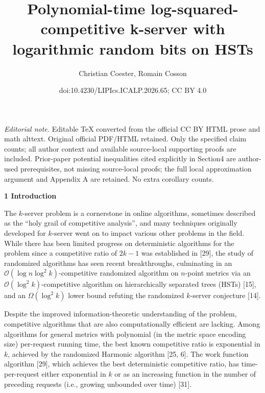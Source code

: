 \documentclass[10pt,a4paper]{article}
\title{Polynomial-time log-squared-competitive k-server with logarithmic random bits on HSTs}
\author{Christian Coester, Romain Cosson}
\date{doi:10.4230/LIPIcs.ICALP.2026.65; CC BY 4.0}
\begin{document}
\maketitle
\noindent\textit{Editorial note.} Editable TeX converted from the official CC BY HTML prose and math alttext. Original official PDF/HTML retained. Only the specified claim counts; all author context and available source-local supporting proofs are included. Prior-paper potential inequalities cited explicitly in Section4 are author-used prerequisites, not missing source-local proofs; the full local approximation argument and Appendix A are retained. No extra corollary counts.\par\medskip


\par\medskip\noindent\textbf{
1 Introduction}\par




The $k$-server problem is a cornerstone in online algorithms, sometimes described as the “holy grail of competitive analysis”, and many techniques originally developed for $k$-server went on to impact various other problems in the field. While there has been limited progress on deterministic algorithms for the problem since a competitive ratio of $2k-1$ was established in [29], the study of randomized algorithms has seen recent breakthroughs, culminating in an $\mathcal{O}(\log n\log^{2}k)$-competitive randomized algorithm on $n$-point metrics via an $\mathcal{O}(\log^{2}k)$-competitive algorithm on hierarchically separated trees (HSTs) [15], and an $\Omega(\log^{2}k)$ lower bound refuting the randomized $k$-server conjecture [14].\par




Despite the improved information-theoretic understanding of the problem, competitive algorithms that are also computationally efficient are lacking. Among algorithms for general metrics with polynomial (in the metric space encoding size) per-request running time, the best known competitive ratio is exponential in $k$, achieved by the randomized Harmonic algorithm [25, 6]. The work function algorithm [29], which achieves the best deterministic competitive ratio, has time-per-request either exponential in $k$ or as an increasing function in the number of preceding requests (i.e., growing unbounded over time) [31].\par
\end{document}
